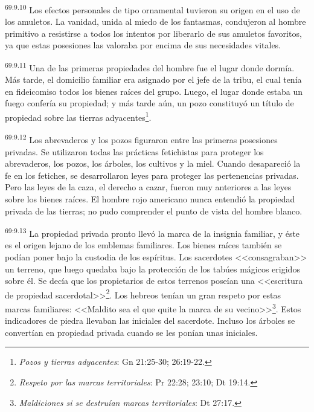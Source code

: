 \documentclass[twoside, 11pt]{book}
\begin{document}
\par
\textsuperscript{69:9.10} Los efectos personales de tipo ornamental tuvieron su origen en el uso de los amuletos. La vanidad, unida al miedo de los fantasmas, condujeron al hombre primitivo a resistirse a todos los intentos por liberarlo de sus amuletos favoritos, ya que estas posesiones las valoraba por encima de sus necesidades vitales.

\par
\textsuperscript{69:9.11} Una de las primeras propiedades del hombre fue el lugar donde dormía. Más tarde, el domicilio familiar era asignado por el jefe de la tribu, el cual tenía en fideicomiso todos los bienes raíces del grupo. Luego, el lugar donde estaba un fuego confería su propiedad; y más tarde aún, un pozo constituyó un título de propiedad sobre las tierras adyacentes\footnote{\textit{Pozos y tierras adyacentes}: Gn 21:25-30; 26:19-22.}.

\par
\textsuperscript{69:9.12} Los abrevaderos y los pozos figuraron entre las primeras posesiones privadas. Se utilizaron todas las prácticas fetichistas para proteger los abrevaderos, los pozos, los árboles, los cultivos y la miel. Cuando desapareció la fe en los fetiches, se desarrollaron leyes para proteger las pertenencias privadas. Pero las leyes de la caza, el derecho a cazar, fueron muy anteriores a las leyes sobre los bienes raíces. El hombre rojo americano nunca entendió la propiedad privada de las tierras; no pudo comprender el punto de vista del hombre blanco.

\par
\textsuperscript{69:9.13} La propiedad privada pronto llevó la marca de la insignia familiar, y éste es el origen lejano de los emblemas familiares. Los bienes raíces también se podían poner bajo la custodia de los espíritus. Los sacerdotes <<consagraban>> un terreno, que luego quedaba bajo la protección de los tabúes mágicos erigidos sobre él. Se decía que los propietarios de estos terrenos poseían una <<escritura de propiedad sacerdotal>>\footnote{\textit{Respeto por las marcas territoriales}: Pr 22:28; 23:10; Dt 19:14.}. Los hebreos tenían un gran respeto por estas marcas familiares: <<Maldito sea el que quite la marca de su vecino>>\footnote{\textit{Maldiciones si se destruían marcas territoriales}: Dt 27:17.}. Estos indicadores de piedra llevaban las iniciales del sacerdote. Incluso los árboles se convertían en propiedad privada cuando se les ponían unas iniciales.
\end{document}
